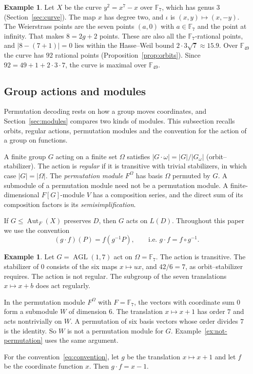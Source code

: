 \documentclass[12pt,letterpaper]{article}
\theoremstyle{definition}
\newtheorem{example}[theorem]{Example}
\theoremstyle{remark}
\numberwithin{equation}{section}
\newcommand{\F}{\mathbb{F}}
\newcommand{\Aut}{\operatorname{Aut}}
\newcommand{\AGL}{\operatorname{AGL}}
\begin{document}
\begin{example}\label{ex:bg-hyper}
Let $X$ be the curve $y^2=x^7-x$ over $\F_7$, which has genus $3$
(Section~\ref{sec:curve}). The map $x$ has degree two, and $\iota$ is
$(x,y)\mapsto(x,-y)$. The Weierstrass points are the seven points $(a,0)$
with $a\in\F_7$ and the point at infinity. That makes $8=2g+2$ points.
These are also all the $\F_7$-rational points, and $|8-(7+1)|=0$ lies
within the Hasse--Weil bound $2\cdot3\sqrt7\approx15.9$. Over $\F_{49}$
the curve has $92$ rational points (Proposition~\ref{prop:orbits}). Since
$92=49+1+2\cdot3\cdot7$, the curve is maximal over $\F_{49}$.
\end{example}

\subsection{Group actions and modules}\label{subsec:bg-groups}
Permutation decoding rests on how a group moves coordinates, and
Section~\ref{sec:modules} compares two kinds of modules. This subsection
recalls orbits, regular actions, permutation modules and the convention
for the action of a group on functions.

A finite group $G$ acting on a finite set $\Omega$ satisfies
$|G\cdot\omega|=|G|/|G_\omega|$ (orbit--stabilizer).  The action is
\emph{regular} if it is transitive with trivial stabilizers, in which
case $|G|=|\Omega|$.  The \emph{permutation module} $F^\Omega$ has basis
$\Omega$ permuted by $G$.  A submodule of a permutation module need not be
a permutation module.  A finite-dimensional $F[G]$-module $V$ has a
composition series, and the direct sum of its composition factors is its
\emph{semisimplification}.

If $G\le\Aut_F(X)$ preserves $D$, then $G$ acts on $L(D)$.  Throughout
this paper we use the convention
\begin{equation}\label{eq:convention}
(g\cdot f)(P)=f(g^{-1}P),\qquad\text{i.e. }g\cdot f=f\circ g^{-1}.
\end{equation}

\begin{example}\label{ex:bg-groups}
Let $G=\AGL(1,7)$ act on $\Omega=\F_7$. The action is transitive. The
stabilizer of $0$ consists of the six maps $x\mapsto ux$, and $42/6=7$,
as orbit--stabilizer requires. The action is not regular. The subgroup of
the seven translations $x\mapsto x+b$ does act regularly.

In the permutation module $F^\Omega$ with $F=\F_7$, the vectors with
coordinate sum $0$ form a submodule $W$ of dimension $6$. The translation
$x\mapsto x+1$ has order $7$ and acts nontrivially on $W$. A permutation
of six basis vectors whose order divides $7$ is the identity. So $W$ is
not a permutation module for $G$. Example~\ref{ex:not-permutation} uses
the same argument.

For the convention~\eqref{eq:convention}, let $g$ be the translation
$x\mapsto x+1$ and let $f$ be the coordinate function $x$. Then
$g\cdot f=x-1$.
\end{example}
\end{document}
